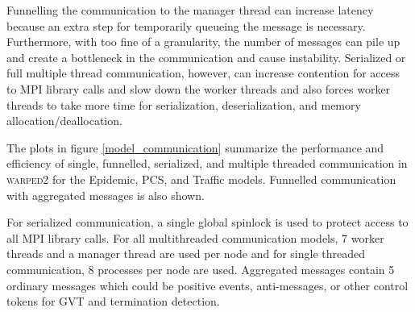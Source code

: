 \documentclass[11pt]{book}
\begin{document}
Funnelling the communication to the manager thread can increase latency because an extra step
for temporarily queueing the message is necessary. Furthermore, with too fine of a granularity,
the number of messages can pile up and create a bottleneck in the communication and cause
instability. Serialized or full multiple thread communication, however, can increase contention
for access to MPI library calls and slow down the worker threads and also forces worker
threads to take more time for serialization, deserialization, and memory allocation/deallocation.

The plots in figure \ref{model_communication} summarize the performance and efficiency of single,
funnelled, serialized, and multiple threaded communication in \textsc{warped2} for the Epidemic,
PCS, and Traffic models. Funnelled communication with aggregated messages is also shown.

For serialized communication, a single global spinlock is used to protect access to all MPI library
calls. For all multithreaded communication models, 7 worker threads and a manager thread are used
per node and for single threaded communication, 8 processes per node are used. Aggregated messages
contain 5 ordinary messages which could be positive events, anti-messages, or other control
tokens for GVT and termination detection.
\end{document}
